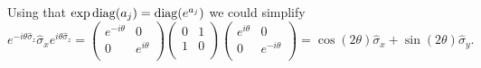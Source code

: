 Using that $\exp \mathop{\mathrm{diag}}\nolimits (a_j) = \mathop{\mathrm{diag}}\nolimits(e^{a_j})$ we could simplify
\begin{equation*}
	e^{- i \theta \hat{\sigma}_z} \hat{\sigma}_x e^{i \theta \hat{\sigma}_z} = 
	\begin{pmatrix}
	    e^{-i \theta} & 0 \\
	    0 & e^{i  \theta} \\
	\end{pmatrix} \begin{pmatrix}
	    0 & 1 \\
	    1 & 0 \\
	\end{pmatrix}
	\begin{pmatrix}
	    e^{i \theta} & 0 \\
	    0 & e^{-i  \theta} \\
	\end{pmatrix}
	=
	\cos(2\theta) \hat{\sigma}_x + \sin(2\theta) \hat{\sigma}_y.
\end{equation*}